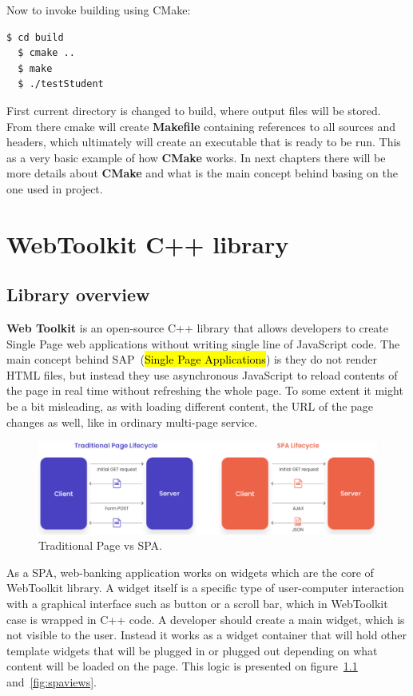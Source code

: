 \documentclass[a4paper,12pt]{book}
\newcommand\tab[1][1cm]{\hspace*{#1}}
\begin{document}
{{\noindent Now to invoke building using CMake:
\begin{lstlisting}[language=bash]
  $ cd build
  $ cmake ..
  $ make
  $ ./testStudent
\end{lstlisting}
  
\bigskip First current directory is changed to build, where output files will be stored. From there cmake will create \textbf{Makefile} containing references to all sources and headers, which ultimately will create an executable that is ready to be run. This as a very basic example of how \textbf{CMake} works. In next chapters there will be more details about \textbf{CMake} and what is the main concept behind basing on the one used in project. 

}

\chapter{WebToolkit C++ library}
\section{Library overview}
{\tab \textbf{Web Toolkit} is an open-source C++ library that allows developers to create Single Page web applications without writing single line of JavaScript code. The main concept behind SAP~\cite{singlepageapplications}(\hl{Single Page Applications}) is they do not render HTML files, but instead they use asynchronous JavaScript to reload contents of the page in real time without refreshing the whole page. To some extent it might be a bit misleading, as with loading different content, the URL of the page changes as well, like in ordinary multi-page service.

\begin{figure}[h]
  \centering
    \includegraphics[width=1.0\textwidth]{spa}
    \caption{Traditional Page vs SPA.}
    \label{fig:tpvsspa}
\end{figure}

\bigskip
As a SPA, web-banking application works on widgets which are the core of WebToolkit library. A widget itself is a specific type of user-computer interaction with a graphical interface such as button or a scroll bar, which in WebToolkit case is wrapped in C++ code. A developer should create a main widget, which is not visible to the user. Instead it works as a widget container that will hold other template widgets that will be plugged in or plugged out depending on what content will be loaded on the page. This logic is presented on figure~\ref{fig:tpvsspa} and~\ref{fig:spaviews}.

}}
\end{document}
